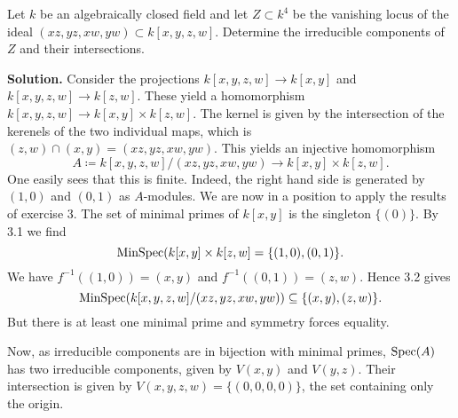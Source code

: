 \documentclass[a4paper,11pt]{article}
\begin{document}
Let $k$ be an algebraically closed field and let $Z \subset k^4$ be
the vanishing locus of the ideal
$(xz,yz,xw,yw) \subset k[x,y,z,w]$. Determine the irreducible components
of $Z$ and their intersections. 

\textbf{Solution.} Consider the projections $k[x,y,z,w] \to k[x,y]$ 
and $k[x,y,z,w] \to k[z,w]$. These yield a homomorphism $k[x,y,z,w] \to
k[x,y] \times k[z,w]$. The kernel is given by the intersection of the kerenels
of the two individual maps, which is $(z,w) \cap (x,y) = (xz,yz, xw, yw)$. 
This yields an injective homomorphism
$$A \coloneqq k[x,y,z,w]/(xz,yz,xw,yw) \to k[x,y] \times k[z,w].$$
One easily sees that this is finite. Indeed, the right hand side is generated
by $(1,0)$ and $(0,1)$ as $A$-modules. 
We are now in a position to apply the results of exercise 3. The set of minimal
primes of $k[x,y]$ is the singleton $\{(0)\}$. By 3.1 we find
\begin{equation*}
    \operatorname{MinSpec}(k[x,y] \times k[z,w] = \{(1,0), (0,1)\}.
\end{equation*}
We have $f^{-1}((1,0)) = (x,y)$ and $f^{-1}((0,1)) = (z,w)$. Hence 3.2 gives
\begin{equation*}
    \operatorname{MinSpec}(k[x,y,z,w]/(xz,yz,xw,yw)) \subseteq \{(x,y), (z,w)\}.
\end{equation*}
But there is at least one minimal prime and symmetry forces equality.

Now, as irreducible components are in bijection with minimal primes,
$\operatorname{Spec}(A)$ has two irreducible components, given by
$V(x,y)$ and $V(y,z)$. Their intersection is given by 
$V(x,y,z,w) = \{(0,0,0,0)\}$, the set containing only the origin.



\contactend
\end{document}
